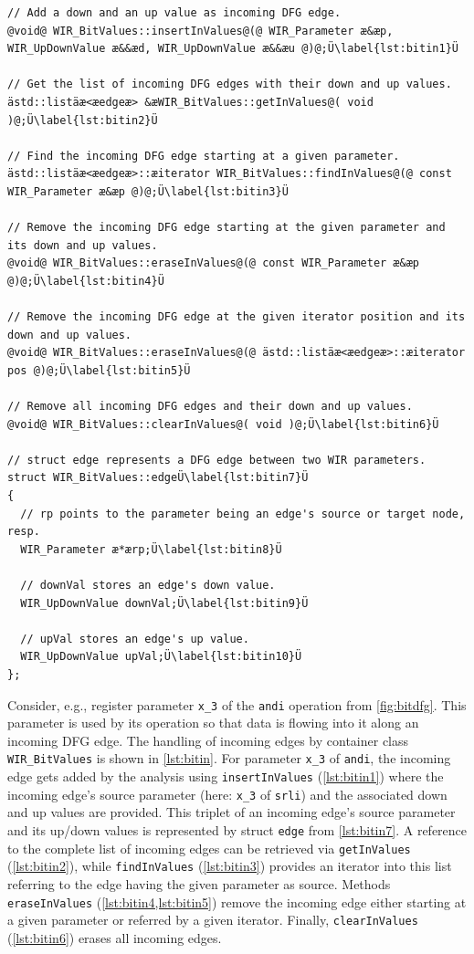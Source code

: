 \begin{lstlisting}[style=code,float=ht,caption={Handling of Incoming Up/Down Values by Container Class \texttt{WIR\_BitValues}},label=lst:bitin]
// Add a down and an up value as incoming DFG edge.
@void@ WIR_BitValues::insertInValues@(@ WIR_Parameter æ&æp, WIR_UpDownValue æ&&æd, WIR_UpDownValue æ&&æu @)@;Ü\label{lst:bitin1}Ü

// Get the list of incoming DFG edges with their down and up values.
ästd::listäæ<æedgeæ> &æWIR_BitValues::getInValues@( void )@;Ü\label{lst:bitin2}Ü

// Find the incoming DFG edge starting at a given parameter.
ästd::listäæ<æedgeæ>::æiterator WIR_BitValues::findInValues@(@ const WIR_Parameter æ&æp @)@;Ü\label{lst:bitin3}Ü

// Remove the incoming DFG edge starting at the given parameter and its down and up values.
@void@ WIR_BitValues::eraseInValues@(@ const WIR_Parameter æ&æp @)@;Ü\label{lst:bitin4}Ü

// Remove the incoming DFG edge at the given iterator position and its down and up values.
@void@ WIR_BitValues::eraseInValues@(@ ästd::listäæ<æedgeæ>::æiterator pos @)@;Ü\label{lst:bitin5}Ü

// Remove all incoming DFG edges and their down and up values.
@void@ WIR_BitValues::clearInValues@( void )@;Ü\label{lst:bitin6}Ü

// struct edge represents a DFG edge between two WIR parameters.
struct WIR_BitValues::edgeÜ\label{lst:bitin7}Ü
{
  // rp points to the parameter being an edge's source or target node, resp.
  WIR_Parameter æ*ærp;Ü\label{lst:bitin8}Ü

  // downVal stores an edge's down value.
  WIR_UpDownValue downVal;Ü\label{lst:bitin9}Ü

  // upVal stores an edge's up value.
  WIR_UpDownValue upVal;Ü\label{lst:bitin10}Ü
};
\end{lstlisting}

Consider, e.g., register parameter \texttt{x\_3} of the \texttt{andi} operation from \cref{fig:bitdfg}.
This parameter is used by its operation so that data is flowing into it along an incoming \gls{DFG} edge.
The handling of incoming edges by container class \texttt{WIR\_BitValues} is shown in \cref{lst:bitin}.
For parameter \texttt{x\_3} of \texttt{andi}, the incoming edge gets added by the analysis using \texttt{insertInValues} (\cref{lst:bitin1}) where the incoming edge's source parameter (here: \texttt{x\_3} of \texttt{srli}) and the associated down and up values are provided.
This triplet of an incoming edge's source parameter and its up/down values is represented by struct \texttt{edge} from \cref{lst:bitin7}.
A reference to the complete list of incoming edges can be retrieved via \texttt{getInValues} (\cref{lst:bitin2}), while \texttt{findInValues} (\cref{lst:bitin3}) provides an iterator into this list referring to the edge having the given parameter as source.
Methods \texttt{eraseInValues} (\cref{lst:bitin4,lst:bitin5}) remove the incoming edge either starting at a given parameter or referred by a given iterator.
Finally, \texttt{clearInValues} (\cref{lst:bitin6}) erases all incoming edges.


